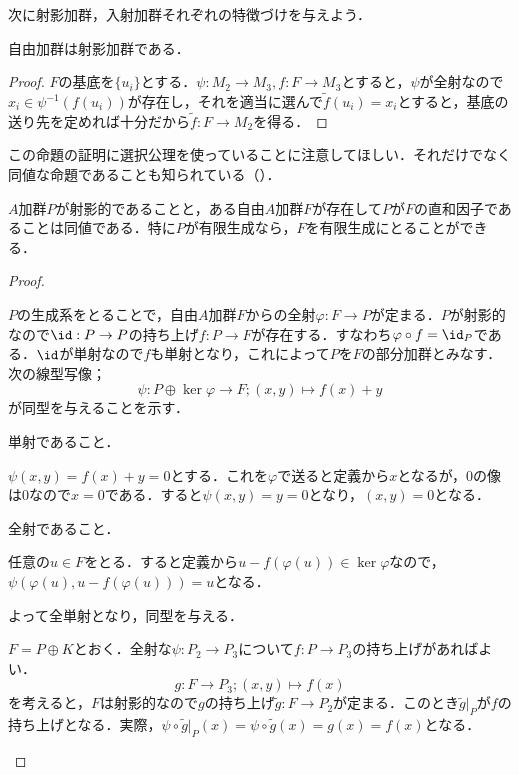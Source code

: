 次に射影加群，入射加群それぞれの特徴づけを与えよう．

\begin{prop}\label{prop:自由加群は射影加群}
	自由加群は射影加群である．
\end{prop}
\begin{proof}
	$F$の基底を$\{u_i\}$とする．$\psi:M_2\to M_3,f:F\to M_3$とすると，$\psi$が全射なので$x_i\in\psi^{-1}(f(u_i))$が存在し，それを適当に選んで$\widetilde{f}(u_i)=x_i$とすると，基底の送り先を定めれば十分だから$\widetilde{f}:F\to M_2$を得る．
\end{proof}

この命題の証明に選択公理を使っていることに注意してほしい．それだけでなく同値な命題であることも知られている（\cite{Blass1979}）．

\begin{thm}\label{thm:射影的と自由の直和因子は同値}
	$A$加群$P$が射影的であることと，ある自由$A$加群$F$が存在して$P$が$F$の直和因子であることは同値である．特に$P$が有限生成なら，$F$を有限生成にとることができる．
\end{thm}
\begin{proof}
	\begin{eqv}
		\item 
		$P$の生成系をとることで，自由$A$加群$F$からの全射$\varphi:F\to P$が定まる．$P$が射影的なので$\id:P\to P$の持ち上げ$f:P\to F$が存在する．すなわち$\varphi\circ f=\id_P$である．$\id$が単射なので$f$も単射となり，これによって$P$を$F$の部分加群とみなす．次の線型写像；
		\[\psi:P\oplus \ker\varphi\to F;(x,y)\mapsto f(x)+y\]
		が同型を与えることを示す．
		
		\begin{step}
			\item 単射であること．
			
			$\psi(x,y)=f(x)+y=0$とする．これを$\varphi$で送ると定義から$x$となるが，0の像は0なので$x=0$である．すると$\psi(x,y)=y=0$となり，$(x,y)=0$となる．
			\item 全射であること．
			
			任意の$u\in F$をとる．すると定義から$u-f(\varphi(u))\in\ker\varphi$なので，$\psi(\varphi(u),u-f(\varphi(u)))=u$となる．
		\end{step}
		よって全単射となり，同型を与える．
		\item 
		$F=P\oplus K$とおく．全射な$\psi:P_2\to P_3$について$f:P\to P_3$の持ち上げがあればよい．
		\[g:F\to P_3;(x,y)\mapsto f(x)\]
		を考えると，$F$は射影的なので$g$の持ち上げ$\widetilde{g}:F\to P_2$が定まる．このとき$\widetilde{g}|_P$が$f$の持ち上げとなる．実際，$\psi\circ\widetilde{g}|_P(x)=\psi\circ\widetilde{g}(x)=g(x)=f(x)$となる．
	\end{eqv}
\end{proof}

